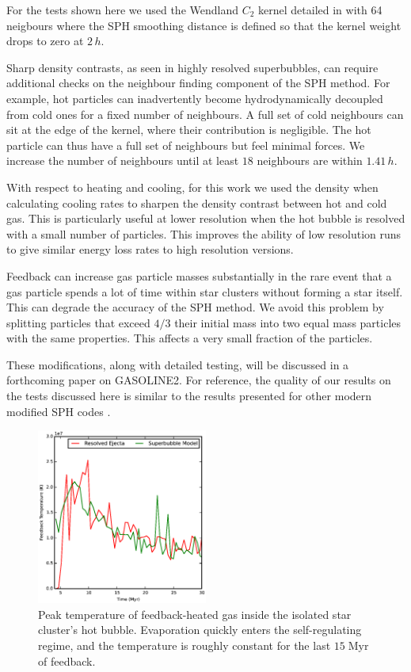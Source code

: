 For the tests shown here we used the Wendland $C_2$ kernel detailed in
\citet{Dehnen2012} with 64 neigbours where the SPH smoothing distance is defined
so that the kernel weight drops to zero at $2\,h$.  

Sharp density contrasts, as seen in highly resolved superbubbles, can require
additional checks on the neighbour finding component of the SPH method.  For
example, hot particles can inadvertently become hydrodynamically decoupled from
cold ones for a fixed number of neighbours.  A full set of cold neighbours can
sit at the edge of the kernel, where their contribution is negligible.  The hot
particle can thus have a full set of neighbours but feel minimal forces.  We
increase the number of neighbours until at least $18$ neighbours are within
$1.41\,h$.  

With respect to heating and cooling, for this work we used the
\citet{Ritchie2001} density when calculating cooling rates to sharpen the
density contrast between hot and cold gas.  This is particularly useful at lower
resolution when the hot bubble is resolved with a small number of particles.
This improves the ability of low resolution runs to give similar energy loss
rates to high resolution versions.
 
Feedback can increase gas particle masses substantially in the rare event that a
gas particle spends a lot of time within star clusters without forming a star
itself.  This can degrade the accuracy of the SPH method.  We avoid this problem
by splitting particles that exceed $4/3$ their initial mass into two equal mass
particles with the same properties.  This affects a very small fraction of the
particles.

These modifications, along with detailed testing, will be discussed in a
forthcoming paper on {\sc GASOLINE2}.  For reference, the quality of our results
on the tests discussed here is similar to the results presented for other modern
modified SPH codes \citep[e.g.][]{Hopkins2013}. 

\begin{figure}
    \includegraphics[width=0.5\textwidth]{figures1/onestar_hottemp.eps}
    \caption[Peak temperature of feedback-heated gas in a superbubble]{Peak
    temperature of feedback-heated gas inside the isolated star cluster's hot
    bubble.  Evaporation quickly enters the self-regulating regime, and the
    temperature is roughly constant for the last $15\;\mathrm{Myr}$ of
    feedback.}
    \label{onestar_hottemp1}
\end{figure}


